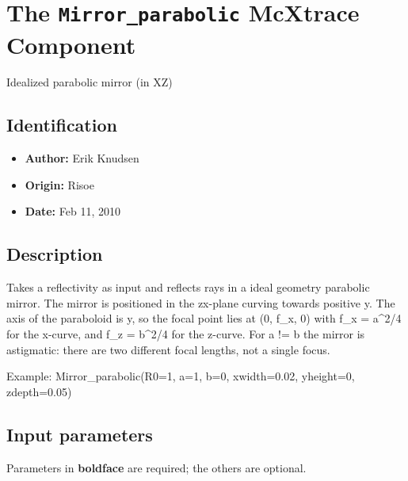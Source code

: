\section{The \texttt{Mirror\_parabolic} McXtrace Component}
Idealized parabolic mirror (in XZ)

\subsection*{Identification}
\begin{itemize}
  \item \textbf{Author:} Erik Knudsen
  \item \textbf{Origin:} Risoe
  \item \textbf{Date:} Feb 11, 2010
\end{itemize}

\subsection*{Description}
Takes a reflectivity as input and reflects rays in a ideal geometry parabolic mirror. The mirror is positioned in the zx-plane curving towards positive y. The axis of the paraboloid is y, so the focal point lies at (0, f\_x, 0) with f\_x = a\textasciicircum{}2/4 for the x-curve, and f\_z = b\textasciicircum{}2/4 for the z-curve. For a != b the mirror is astigmatic: there are two different focal lengths, not a single focus.

Example: Mirror\_parabolic(R0=1, a=1, b=0, xwidth=0.02, yheight=0, zdepth=0.05)

\subsection*{Input parameters}
Parameters in \textbf{boldface} are required; the others are optional.

